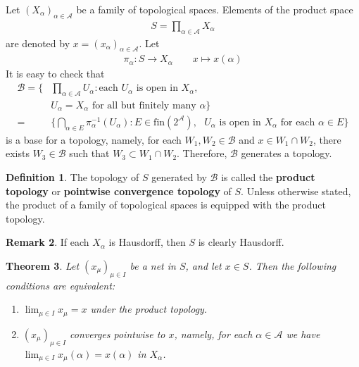 \documentclass[12pt,b5paper,notitlepage]{article}
\theoremstyle{definition}
\newtheorem{df}{Definition}[section]
\newtheorem{rem}[df]{Remark}
\theoremstyle{plain}
\newtheorem{thm}[df]{Theorem}
\newcommand{\mc}{\mathcal}
\newcommand{\scr}{\mathscr}
\newcommand{\fin}{\mathrm{fin}}
\newcommand{\dps}{\displaystyle}
\numberwithin{equation}{section}
\begin{document}
Let $(X_\alpha)_{\alpha\in\scr A}$ be a family of topological spaces. Elements of the product space
\begin{align*}
S=\prod_{\alpha\in\scr A}X_\alpha
\end{align*}
are denoted by $x=(x_\alpha)_{\alpha\in\scr A}$. Let
\begin{align*}
\pi_\alpha:S\rightarrow X_\alpha\qquad x\mapsto x(\alpha)
\end{align*}
It is easy to check that
\begin{align*}
\mc B=\Big\{&\prod_{\alpha\in\scr A} U_\alpha: \text{each $U_\alpha$ is open in $X_\alpha$},\\
& \text{$U_\alpha=X_\alpha$ for all but finitely many $\alpha$}\Big\}\\
=&\Big\{\bigcap_{\alpha\in E} \pi_\alpha^{-1}(U_\alpha):E\in\fin(2^{\scr A}), \text{ $U_\alpha$ is open in $X_\alpha$ for each $\alpha\in E$}    \Big\}
\end{align*}
is a base for a topology, namely, for each $W_1,W_2\in\mc B$ and $x\in W_1\cap W_2$, there exists $W_3\in\mc B$ such that $W_3\subset W_1\cap W_2$. Therefore, $\mc B$ generates a topology.
\begin{df}
The topology of $S$ generated by $\mc B$ is called the \textbf{product topology}  or \textbf{pointwise convergence topology}  of $S$. Unless otherwise stated, the product of a family of topological spaces is equipped with the product topology.
\end{df}

\begin{rem}
If each $X_\alpha$ is Hausdorff, then $S$ is clearly Hausdorff.
\end{rem}


\begin{thm}\label{lb50}
Let $(x_\mu)_{\mu\in I}$ be a net in $S$, and let $x\in S$. Then the following conditions are equivalent:
\begin{enumerate}[label=(\alph*)]
\item $\dps\lim_{\mu\in I}x_\mu=x$ under the product topology.
\item $(x_\mu)_{\mu\in I}$ converges pointwise to $x$, namely, for each $\alpha\in\scr A$ we have $\dps\lim_{\mu\in I}x_\mu(\alpha)=x(\alpha)$ in $X_\alpha$.
\end{enumerate}
\end{thm}
\end{document}
